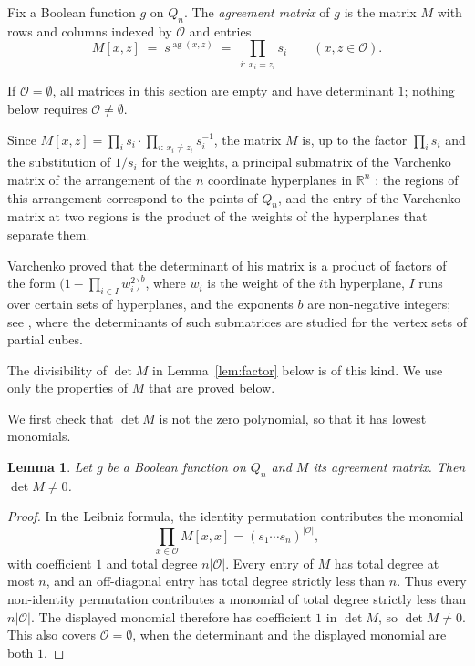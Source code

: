\documentclass[11pt,reqno]{amsart}
\newtheorem{lemma}[theorem]{Lemma}
\theoremstyle{definition}
\theoremstyle{remark}
\numberwithin{equation}{section}
\theoremstyle{named}
\theoremstyle{plain}
\newcommand{\R}{\mathbb{R}}
\newcommand{\ag}{\operatorname{ag}}
\newcommand{\cO}{\mathcal{O}}
\newcommand{\abs}[1]{\lvert #1\rvert}
\begin{document}
Fix a Boolean function $g$ on $Q_n$. The \emph{agreement matrix} of $g$ is the matrix $M$ with rows
and columns indexed by $\cO$ and entries
\[
   M[x,z]\;=\;s^{\ag(x,z)}\;=\;\prod_{i:\,x_i=z_i}s_i\qquad(x,z\in\cO).
\]

If $\cO=\emptyset$, all matrices in this section are empty and have determinant $1$; nothing below
requires $\cO\ne\emptyset$.

Since $M[x,z]=\prod_{i}s_i\cdot\prod_{i:\,x_i\ne z_i}s_i^{-1}$, the matrix $M$ is, up to the factor
$\prod_is_i$ and the substitution of $1/s_i$ for the weights, a principal submatrix of the Varchenko
matrix of the arrangement of the $n$ coordinate hyperplanes in $\R^{n}$ \cite{Var}: the regions of
this arrangement correspond to the points of $Q_n$, and the entry of the Varchenko matrix at two
regions is the product of the weights of the hyperplanes that separate them.

Varchenko proved that the determinant of his matrix is a product of factors of the form
$\bigl(1-\prod_{i\in I}w_i^{2}\bigr)^{b}$, where $w_i$ is the weight of the $i$th hyperplane, $I$
runs over certain sets of hyperplanes, and the exponents $b$ are non-negative integers; see
\cite{HKY}, where the determinants of such submatrices are studied for the vertex sets of partial
cubes.

The divisibility of $\det M$ in
Lemma~\ref{lem:factor} below is of this kind. We use only the properties of $M$ that are proved
below.

We first check that $\det M$ is not the zero polynomial, so that it has lowest monomials.

\begin{lemma}\label{lem:nonzero}
Let $g$ be a Boolean function on $Q_n$ and $M$ its agreement matrix. Then \mbox{$\det M\ne0$}.
\end{lemma}

\begin{proof}
In the Leibniz formula, the identity permutation contributes the monomial
\[
   \prod_{x\in\cO}M[x,x]=(s_1\cdots s_n)^{\abs{\cO}},
\]
with coefficient $1$ and total degree $n\abs{\cO}$. Every entry of $M$ has total degree at most
$n$, and an off-diagonal entry has total degree strictly less than $n$. Thus every non-identity
permutation contributes a monomial of total degree strictly less than $n\abs{\cO}$. The displayed
monomial therefore has coefficient $1$ in $\det M$, so $\det M\ne0$. This also covers
$\cO=\emptyset$, when the determinant and the displayed monomial are both $1$.
\end{proof}
\end{document}
